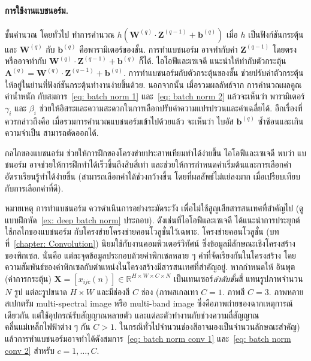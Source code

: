\paragraph{การใช้งานแบชนอร์ม.}
ชั้นคำนวณ โดยทั่วไป
ทำการคำนวณ $h(\bm{W}^{(q)} \cdot \bm{Z}^{(q-1)} + \bm{b}^{(q)})$
เมื่อ $h$ เป็นฟังก์ชันกระตุ้น
และ $\bm{W}^{(q)}$ กับ $\bm{b}^{(q)}$ คือพารามิเตอร์ของชั้น.
การทำแบชนอร์ม อาจทำกับค่า $\bm{Z}^{(q-1)}$
โดยตรง หรืออาจทำกับ $\bm{W}^{(q)} \cdot \bm{Z}^{(q-1)} + \bm{b}^{(q)}$ ก็ได้.
ไอโอฟีและเซเจดี\cite{IoffeSzegedy2015a}
แนะนำให้ทำกับตัวกระตุ้น $\bm{A}^{(q)} = \bm{W}^{(q)} \cdot \bm{Z}^{(q-1)} + \bm{b}^{(q)}$.
การทำแบชนอร์มกับตัวกระตุ้นของชั้น ช่วยปรับค่าตัวกระตุ้นให้อยู่ในย่านที่ฟังก์ชันกระตุ้นทำงานง่ายขึ้นด้วย.
นอกจากนั้น
เมื่อรวมผลลัพธ์จาก การคำนวณผลคูณค่าน้ำหนัก
กับสมการ~\ref{eq: batch norm 1} และ~\ref{eq: batch norm 2}
แล้วจะเห็นว่า พารามิเตอร์ $\gamma_i$ และ $\beta_i$
ช่วยให้อิสระและความสะดวกในการเลือกปรับค่าความแปรปรวนและค่าเฉลี่ยได้.
อีกเรื่องที่ควรกล่าวถึงคือ  เมื่อรวมการคำนวณแบชนอร์มเข้าไปด้วยแล้ว 
จะเห็นว่า ไบอัส $\bm{b}^{(q)}$ ซ้ำซ้อนและเกินความจำเป็น สามารถตัดออกได้.

กลไกของแบชนอร์ม ช่วยให้การฝึกของโครงข่ายประสาทเทียมทำได้ง่ายขึ้น
ไอโอฟีและเซเจดี\cite{IoffeSzegedy2015a} 
พบว่า
แบชนอร์ม อาจช่วยให้การฝึกทำได้เร็วขึ้นถึงสิบสี่เท่า
และช่วยให้การกำหนดค่าเริ่มต้นและการเลือกค่าอัตราเรียนรู้ทำได้ง่ายขึ้น
(สามารถเลือกค่าได้ช่วงกว้างขึ้น 
โดยที่ผลลัพธ์ไม่แย่ลงมาก เมื่อเปรียบเทียบกับการเลือกค่าที่ดี).

หมายเหตุ
การทำแบชนอร์ม ควรดำเนินการอย่างระมัดระวัง
เพื่อไม่ใช้สูญเสียสารสนเทศที่สำคัญไป (ดูแบบฝึกหัด~\ref{ex: deep batch norm} ประกอบ).
ดังเช่นที่ไอโอฟีและเซเจดี\cite{IoffeSzegedy2015a}
ได้แนะนำการประยุกต์ใช้กลไกของแบชนอร์ม
กับโครงข่ายโครงข่ายคอนโวลูชั่นไว้เฉพาะ.
โครงข่ายคอนโวลูชั่น
(บทที่~\ref{chapter: Convolution})
นิยมใช้กับงานคอมพิวเตอร์วิทัศน์
ซึ่งข้อมูลมีลักษณะเชิงโครงสร้างของพิกเซล.
นั่นคือ แต่ละจุดข้อมูลประกอบด้วยค่าพิกเซลหลาย ๆ ค่าที่จัดเรียงกันในโครงสร้าง โดยความสัมพันธ์ของค่าพิกเซลกับตำแหน่งในโครงสร้างมีสารสนเทศที่สำคัญอยู่.
หากกำหนดให้
อินพุต (ค่าการกระตุ้น) 
$\bm{X} = [x_{ijc}(n)] \in \mathbb{R}^{H \times W \times C \times N}$ 
เป็นเทนเซอร์\textit{ลำดับชั้น}สี่
%
แทนรูปภาพจำนวน $N$ รูป
แต่ละรูปขนาด $H \times W$ 
และมีช่องสี $C$ ช่อง (ภาพสเกลเทา $C=1$.
ภาพสี $C=3$.
ภาพหลายสเปกตรัม multi-spectral image หรือ multi-band image ซึ่งคือภาพถ่ายของฉากเหตุการณ์เดียวกัน แต่ใช้อุปกรณ์รับสัญญาณหลายตัว และแต่ละตัวทำงานกับช่วงความถี่สัญญาณคลื่นแม่เหล็กไฟฟ้าต่าง ๆ กัน $C > 1$.
ในกรณีทั่วไปจำนวนช่องสีอาจมองเป็นจำนวนลักษณะสำคัญ)
แล้วการทำแบชนอร์มอาจทำได้ดังสมการ~\ref{eq: batch norm conv 1} และ~\ref{eq: batch norm conv 2} สำหรับ $c = 1, \ldots, C$.


